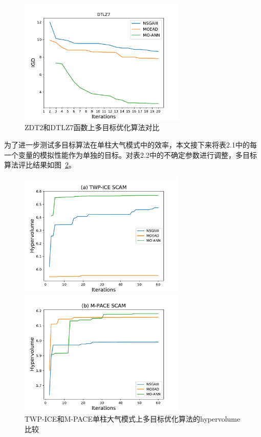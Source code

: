 \begin{figure}[H]
\begin{minipage}[t]{0.48\textwidth}
\end{minipage}
\begin{minipage}[t]{0.48\textwidth}
\centering
\includegraphics[width=8cm]{figures/igd_DTLZ7.pdf}
\end{minipage}
\caption{ZDT2和DTLZ7函数上多目标优化算法对比}
\label{fig:mofunctions}
\end{figure}

为了进一步测试多目标算法在单柱大气模式中的效率，本文接下来将表2.1中的每一个变量的模拟性能作为单独的目标。对表2.2中的不确定参数进行调整，多目标算法评比结果如图~\ref{fig:moscam}。

\begin{figure}[H]
\centering
\begin{minipage}[t]{0.48\textwidth}
\centering
\includegraphics[width=8cm]{figures/MO-TWP.pdf}
\end{minipage}
\begin{minipage}[t]{0.48\textwidth}
\centering
\includegraphics[width=8cm]{figures/ARW-MO.pdf}
\end{minipage}
\caption{TWP-ICE和M-PACE单柱大气模式上多目标优化算法的hypervolume比较}
\label{fig:moscam}
\end{figure}

